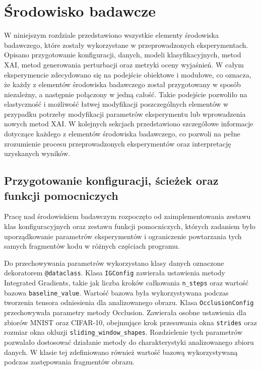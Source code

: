\chapter{Środowisko badawcze}

W niniejszym rozdziale przedstawiono wszystkie elementy środowiska badawczego, które zostały wykorzystane w przeprowadzonych eksperymentach. Opisano przygotowanie konfiguracji, danych, modeli klasyfikacyjnych, metod XAI, metod generowania perturbacji oraz metryki oceny wyjaśnień. W całym eksperymencie zdecydowano się na podejście obiektowe i modułowe, co oznacza, że każdy z elementów środowiska badawczego został przygotowany w sposób niezależny, a następnie połączony w jedną całość. Takie podejście pozwoliło na elastyczność i możliwość łatwej modyfikacji poszczególnych elementów w przypadku potrzeby modyfikacji parametrów eksperymentu lub wprowadzenia nowych metod XAI. W kolejnych sekcjach przedstawiono szczegółowe informacje dotyczące każdego z elementów środowiska badawczego, co pozwoli na pełne zrozumienie procesu przeprowadzonych eksperymentów oraz interpretację uzyskanych wyników.

\section{Przygotowanie konfiguracji, ścieżek oraz funkcji pomocniczych}
\label{sec:config_sciezki_utils}

Pracę nad środowiskiem badawczym rozpoczęto od zaimplementowania zestawu klas konfiguracyjnych oraz zestawu funkcji pomocniczych, których zadaniem było uporządkowanie parametrów eksperymentów i ograniczenie powtarzania tych samych fragmentów kodu w różnych częściach programu.

Do przechowywania parametrów wykorzystano klasy danych oznaczone dekoratorem \texttt{@dataclass}. Klasa \texttt{IGConfig} zawierała ustawienia metody Integrated Gradients, takie jak liczba kroków całkowania \texttt{n\_steps} oraz wartość bazowa \texttt{baseline\_value}. Wartość bazowa była wykorzystywana podczas tworzenia tensora odniesienia dla analizowanego obrazu. Klasa \texttt{OcclusionConfig} przechowywała parametry metody Occlusion. Zawierała osobne ustawienia dla zbiorów MNIST oraz CIFAR-10, obejmujące krok przesuwania okna \texttt{strides} oraz rozmiar okna okluzji \texttt{sliding\_window\_shapes}. Rozdzielenie tych parametrów pozwalało dostosować działanie metody do charakterystyki analizowanego zbioru danych. W klasie tej zdefiniowano również wartość bazową wykorzystywaną podczas zastępowania fragmentów obrazu.

